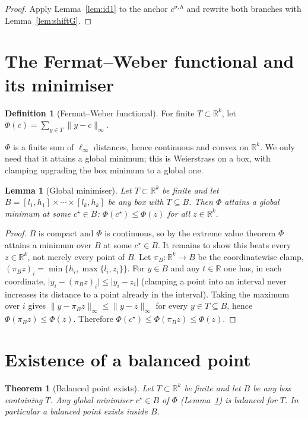 \documentclass[11pt]{article}
\theoremstyle{plain}
\newtheorem{theorem}{Theorem}
\newtheorem{lemma}{Lemma}
\theoremstyle{definition}
\newtheorem{definition}{Definition}
\theoremstyle{remark}
\newcommand{\R}{\mathbb{R}}
\newcommand{\Rk}{\R^{k}}
\newcommand{\linf}[1]{\lVert #1 \rVert_{\infty}}
\newcommand{\abs}[1]{\lvert #1 \rvert}
\newcommand{\sgn}{\sigma}
\newcommand{\FW}{\Phi}
\begin{document}
\begin{proof}
Apply Lemma~\ref{lem:id1} to the anchor $c^{\sgn,h}$ and rewrite both branches
with Lemma~\ref{lem:shiftG}.
\end{proof}

\section{The Fermat--Weber functional and its minimiser}

\begin{definition}[Fermat--Weber functional]\label{def:fw}
For finite $T\subset\Rk$, let
$\displaystyle \FW(c)=\sum_{y\in T}\linf{y-c}$.
\end{definition}

$\FW$ is a finite sum of $\ell_\infty$ distances, hence continuous and convex on
$\Rk$. We only need that it attains a global minimum; this is Weierstrass on a
box, with clamping upgrading the box minimum to a global one.

\begin{lemma}[Global minimiser]\label{lem:min}
Let $T\subset\Rk$ be finite and let $B=[l_1,h_1]\times\cdots\times[l_k,h_k]$ be
any box with $T\subseteq B$. Then $\FW$ attains a global minimum at some
$c^\star\in B$: $\FW(c^\star)\le\FW(z)$ for all $z\in\Rk$.
\end{lemma}

\begin{proof}
$B$ is compact and $\FW$ is continuous, so by the extreme value theorem $\FW$
attains a minimum over $B$ at some $c^\star\in B$. It remains to show this beats
every $z\in\Rk$, not merely every point of $B$. Let $\pi_B\colon\Rk\to B$ be the
coordinatewise clamp, $(\pi_B z)_i=\min\{h_i,\max\{l_i,z_i\}\}$. For $y\in B$ and
any $t\in\R$ one has, in each coordinate,
$\abs{y_i-(\pi_B z)_i}\le\abs{y_i-z_i}$ (clamping a point into an interval never
increases its distance to a point already in the interval). Taking the maximum
over $i$ gives $\linf{y-\pi_B z}\le\linf{y-z}$ for every $y\in T\subseteq B$,
hence $\FW(\pi_B z)\le\FW(z)$. Therefore
$\FW(c^\star)\le\FW(\pi_B z)\le\FW(z)$.
\end{proof}

\section{Existence of a balanced point}

\begin{theorem}[Balanced point exists]\label{thm:main}
Let $T\subset\Rk$ be finite and let $B$ be any box containing $T$. Any global
minimiser $c^\star\in B$ of $\FW$ (Lemma~\ref{lem:min}) is balanced for $T$. In
particular a balanced point exists inside $B$.
\end{theorem}
\end{document}
